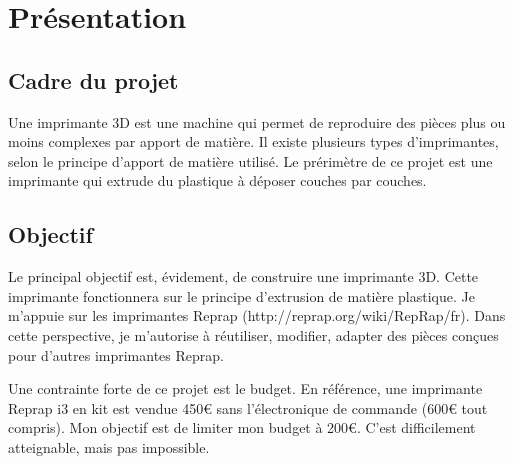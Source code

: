 \section{Présentation}
\subsection{Cadre du projet}
Une imprimante 3D est une machine qui permet de reproduire des pièces %
plus ou moins complexes par apport de matière. Il existe plusieurs types %
d'imprimantes, selon le principe d'apport de matière utilisé. Le prérimètre %
de ce projet est une imprimante qui extrude du plastique à déposer couches %
par couches.
\subsection{Objectif}
Le principal objectif est, évidement, de construire une imprimante 3D. Cette %
imprimante fonctionnera sur le principe d'extrusion de matière plastique. Je %
m'appuie sur les imprimantes Reprap (http://reprap.org/wiki/RepRap/fr). Dans %
cette perspective, je m'autorise à réutiliser, modifier, adapter des pièces %
conçues pour d'autres imprimantes Reprap. \par
Une contrainte forte de ce projet est le budget. En référence, une imprimante %
Reprap i3 en kit est vendue 450\euro{} sans l'électronique de commande (600\euro{} tout %
compris). Mon objectif est de limiter mon budget à 200\euro{}. C'est difficilement %
atteignable, mais pas impossible.